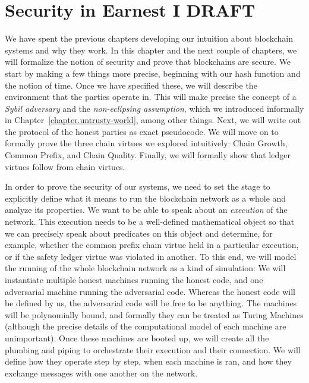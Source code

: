 \chapter{Security in Earnest I \small{\textsf{DRAFT}}}\label{chapter.earnest1}


We have spent the previous chapters developing our intuition about blockchain systems and why
they work. In this chapter and the next couple of chapters, we will formalize the notion of
security and prove that blockchains are secure. We start by making a few things more precise,
beginning with our hash function and the notion of time. Once we have specified these, we
will describe the environment that the parties operate in. This will make precise
the concept of a \emph{Sybil adversary} and the \emph{non-eclipsing assumption}, which we introduced informally
in Chapter~\ref{chapter.untrusty-world}, among other things.
Next, we will write out the protocol of the honest parties as exact pseudocode.
We will move on to formally prove the three chain virtues we explored intuitively:
Chain Growth, Common Prefix, and Chain Quality.
Finally, we will formally show that ledger virtues follow from chain virtues.

In order to prove the security of our systems,
we need to set the stage to explicitly define what it means to run the blockchain network as a
whole and analyze its properties. We want to be able to speak about an \emph{execution} of the network.
This execution needs to be a well-defined mathematical object so that we can precisely speak about
predicates on this object and determine, for example, whether the common prefix chain virtue held in a
particular execution, or if the safety ledger virtue was violated in another. To this end, we will
model the running of the whole blockchain network as a kind of simulation: We will instantiate multiple
honest machines running the honest code, and one adversarial machine running the adversarial code.
Whereas the honest code will be defined by us, the adversarial code will be free to be anything.
The machines will be polynomially bound, and formally they can be treated as Turing Machines (although
the precise details of the computational model of each machine are unimportant). Once these machines
are booted up, we will create all the plumbing and piping to orchestrate their execution and their
connection. We will define how they operate step by step, when each machine is ran, and how they
exchange messages with one another on the network.

